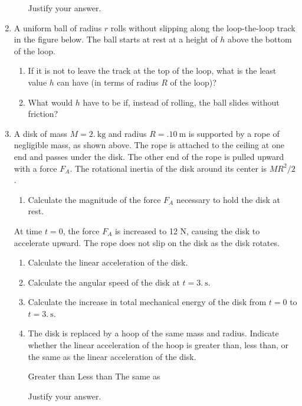 \documentclass{../../../oss-classkick}
\begin{document}
\begin{enumerate}
\begin{enumerate}[resume]
    \vspace{.1in}Justify your answer.
  \end{enumerate}
  \newpage
  
\item A uniform ball of radius $r$ rolls without slipping along the
  loop-the-loop track in the figure below. The ball starts at rest at a height
  of $h$ above the bottom of the loop.
  \begin{enumerate}
  \item If it is not to leave the track at the top of the loop, what is the
    least value $h$ can have (in terms of radius $R$ of the loop)?
  \item What would $h$ have to be if, instead of rolling, the ball slides
    without friction?
  \end{enumerate}
  \newpage
  
  \begin{center}
  \end{center}
\item A disk of mass $M =\SI{2.}{\kilo\gram}$ and radius $R=\SI{.10}{\metre}$ is
  supported by a rope of negligible mass, as shown above. The rope is attached
  to the ceiling at one end and passes under the disk. The other end of the
  rope is pulled upward with a force $F_A$. The rotational inertia of the disk
  around its center is $MR^2/2$.
  \begin{enumerate}
  \item Calculate the magnitude of the force $F_A$ necessary to hold the disk
    at rest.
  \end{enumerate}
  At time $t=0$, the force $F_A$ is increased to 12 N, causing the disk to
  accelerate upward. The rope does not slip on the disk as the disk rotates.
  \begin{enumerate}[resume]
  \item Calculate the linear acceleration of the disk.
  \item Calculate the angular speed of the disk at $t=\SI{3.}{\second}$.
  \item Calculate the increase in total mechanical energy of the disk from
    $t=0$ to $t=\SI{3.}{\second}$.
  \item The disk is replaced by a hoop of the same mass and radius. Indicate
    whether the linear acceleration of the hoop is greater than, less than, or
    the same as the linear acceleration of the disk.

    \vspace{.1in}   
    \underline{\hspace{.3in}} Greater than\hspace{.2in}
    \underline{\hspace{.3in}} Less than\hspace{.2in}
    \underline{\hspace{.3in}} The same as

    \vspace{.1in}Justify your answer.
  \end{enumerate}
\end{enumerate}
\end{document}
